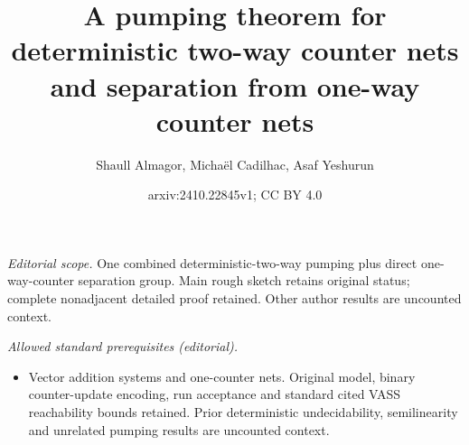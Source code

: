 \documentclass[11pt,a4paper]{amsart}
\title{A pumping theorem for deterministic two-way counter nets and separation from one-way counter nets}
\author{Shaull Almagor, Michaël Cadilhac, Asaf Yeshurun}
\date{arxiv:2410.22845v1; CC BY 4.0}
\theoremstyle{definition}
\begin{document}
\maketitle
\noindent\textit{Editorial scope.} One combined deterministic-two-way pumping plus direct one-way-counter separation group. Main rough sketch retains original status; complete nonadjacent detailed proof retained. Other author results are uncounted context.\par\medskip
\noindent\textit{Allowed standard prerequisites (editorial).}\begin{itemize}
\item Vector addition systems and one-counter nets. Original model, binary counter-update encoding, run acceptance and standard cited VASS reachability bounds retained. Prior deterministic undecidability, semilinearity and unrelated pumping results are uncounted context.
\end{itemize}\medskip
\end{document}
